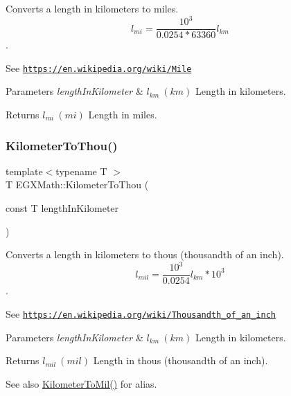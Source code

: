 Converts a length in kilometers to miles. \[ l_{mi}=\frac{10^{3}}{0.0254 * 63360} l_{km} \]. 

See \href{https://en.wikipedia.org/wiki/Mile}{\tt https\+://en.\+wikipedia.\+org/wiki/\+Mile} 
\begin{DoxyParams}{Parameters}
{\em length\+In\+Kilometer} & $ l_{km}\ (km)$ Length in kilometers. \\
\hline
\end{DoxyParams}
\begin{DoxyReturn}{Returns}
$ l_{mi}\ (mi)$ Length in miles. 
\end{DoxyReturn}
\mbox{\label{group___e_g_x_math-_conversions-_length_conversions-_s_i-_kilometer-_imperial_gabcd7d2e467bc0e80c61257ba641d0f48}} 
\subsubsection{\texorpdfstring{Kilometer\+To\+Thou()}{KilometerToThou()}}
{\footnotesize\ttfamily template$<$typename T $>$ \\
T E\+G\+X\+Math\+::\+Kilometer\+To\+Thou (\begin{DoxyParamCaption}\item[{const T}]{length\+In\+Kilometer }\end{DoxyParamCaption})}



Converts a length in kilometers to thous (thousandth of an inch). \[ l_{mil}= \frac{10^{3}}{0.0254} l_{km} * 10^{3} \]. 

See \href{https://en.wikipedia.org/wiki/Thousandth_of_an_inch}{\tt https\+://en.\+wikipedia.\+org/wiki/\+Thousandth\+\_\+of\+\_\+an\+\_\+inch} 
\begin{DoxyParams}{Parameters}
{\em length\+In\+Kilometer} & $ l_{km}\ (km)$ Length in kilometers. \\
\hline
\end{DoxyParams}
\begin{DoxyReturn}{Returns}
$ l_{mil}\ (mil)$ Length in thous (thousandth of an inch). 
\end{DoxyReturn}
\begin{DoxySeeAlso}{See also}
\mbox{\hyperlink{group___e_g_x_math-_conversions-_length_conversions-_s_i-_kilometer-_imperial_ga4d25c16818235ceaad64d1119e23e01f}{Kilometer\+To\+Mil()}} for alias. 
\end{DoxySeeAlso}
\mbox{\label{group___e_g_x_math-_conversions-_length_conversions-_s_i-_kilometer-_imperial_ga98f724c96246bb6dcb517fc64ff5ade1}} 
